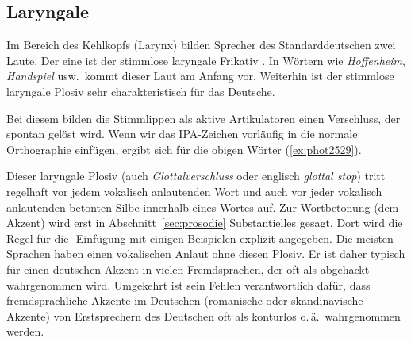 \subsection{Laryngale}

\label{sec:photlaryngale}


Im Bereich des Kehlkopfs (Larynx) bilden Sprecher des Standarddeutschen zwei Laute.
Der eine ist der stimmlose laryngale Frikativ \textipa{[h]}.
In Wörtern wie \textit{Hoffenheim}, \textit{Handspiel} usw.\ kommt dieser Laut am Anfang vor.
Weiterhin ist der stimmlose laryngale Plosiv \textipa{[P]} sehr charakteristisch für das Deutsche.


Bei diesem bilden die Stimmlippen als aktive Artikulatoren einen Verschluss, der spontan gelöst wird.
Wenn wir das IPA-Zeichen vorläufig in die normale Orthographie einfügen, ergibt sich für die obigen Wörter (\ref{ex:phot2529}).

\begin{exe}
  \ex\label{ex:phot2529}
  \begin{xlist}
  \end{xlist}
\end{exe}

Dieser laryngale Plosiv (auch \textit{Glottalverschluss} oder englisch \textit{glottal stop}) tritt regelhaft vor jedem vokalisch anlautenden Wort und auch vor jeder vokalisch anlautenden betonten Silbe innerhalb eines Wortes auf.
Zur Wortbetonung (dem Akzent) wird erst in Abschnitt~\ref{sec:prosodie} Substantielles gesagt.
Dort wird die Regel für die \textipa{[P]}-Einfügung mit einigen Beispielen explizit angegeben.
Die meisten Sprachen haben einen vokalischen Anlaut ohne diesen Plosiv.
Er ist daher typisch für einen deutschen Akzent in vielen Fremdsprachen, der oft als abgehackt wahrgenommen wird.
Umgekehrt ist sein Fehlen verantwortlich dafür, dass fremdsprachliche Akzente im Deutschen (\zB romanische oder skandinavische Akzente) von Erstsprechern des Deutschen oft als konturlos o.\,ä.\ wahrgenommen werden.


